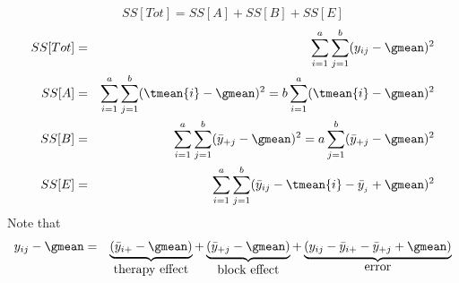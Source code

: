 $$ SS[Tot] = SS[A] + SS[B] + SS[E]$$
\begin{eqnarray*}
SS[Tot] &=& \sum_{i=1}^a \sum_{j=1}^b (y_{ij}-\gmean)^2 \\
SS[A] &=& \sum_{i=1}^a \sum_{j=1}^b (\tmean{i} -\gmean)^2 
= b \sum_{i=1}^a (\tmean{i}-\gmean)^2  \\
SS[B] &=& \sum_{i=1}^a \sum_{j=1}^b (\bar{y}_{+j} -\gmean)^2
= a  \sum_{j=1}^b (\bar{y}_{+j} -\gmean)^2 \\
SS[E] &=& \sum_{i=1}^a \sum_{j=1}^b (\bar{y}_{ij} -\tmean{i}-\bar{y}_{_j}+\gmean)^2
\end{eqnarray*}
Note that
\begin{eqnarray*}
y_{ij}-\gmean &=& 
\underbrace{(\bar{y}_{i+}-\gmean)}_{\mbox{therapy effect}} + 
\underbrace{(\bar{y}_{+j} -\gmean)}_{\mbox{block effect}} + 
\underbrace{(y_{ij}-\bar{y}_{i+}-\bar{y}_{+j} + \gmean)}_{\mbox{error}}
\end{eqnarray*}


